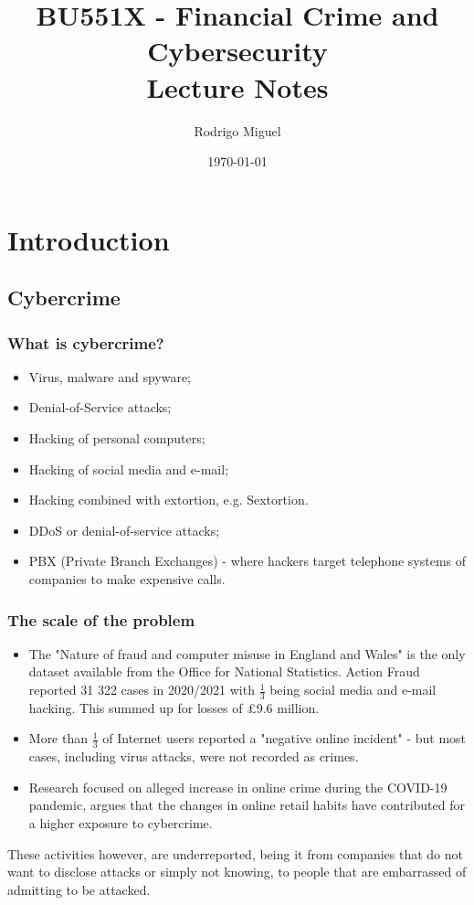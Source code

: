 \documentclass[11pt,a4paper]{report}
\title{BU551X - Financial Crime and Cybersecurity \\ Lecture Notes}
\author{Rodrigo Miguel}
\date{\today}
\begin{document}
\maketitle
\tableofcontents

\chapter{Introduction}
\section{Cybercrime}
\subsection{What is cybercrime?}
\begin{itemize}
    \item Virus, malware and spyware;
    \item Denial-of-Service attacks;
    \item Hacking of personal computers;
    \item Hacking of social media and e-mail;
    \item Hacking combined with extortion, e.g. Sextortion.
    \item DDoS or denial-of-service attacks;
    \item PBX (Private Branch Exchanges) - where hackers target telephone systems of companies to make expensive calls.
\end{itemize}
\subsection{The scale of the problem}
\begin{itemize}
    \item The "Nature of fraud and computer misuse in England and Wales" is the only dataset available from the Office for National Statistics.  Action Fraud reported 31 322 cases in 2020/2021 with $\frac{1}{3}$ being social media and e-mail hacking. This summed up for losses of £9.6 million.
    \item More than $\frac{1}{3}$ of Internet users reported a "negative online incident" - but most cases, including virus attacks, were not recorded as crimes.
    \item Research focused on alleged increase in online crime during the COVID-19 pandemic, argues that the changes in online retail habits have contributed for a higher exposure to cybercrime.
\end{itemize}
These activities however, are underreported, being it from companies that do not want to disclose attacks or simply not knowing, to people that are embarrassed of admitting to be attacked.
\end{document}
